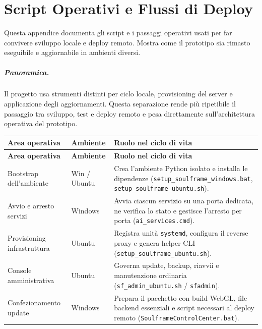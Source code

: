 \chapter{Script Operativi e Flussi di Deploy}
\label{app:ops}

\setlength{\emergencystretch}{3em}
\hfuzz=20pt

Questa appendice documenta gli script e i passaggi operativi usati per far convivere sviluppo locale e deploy remoto. Mostra come il prototipo sia rimasto eseguibile e aggiornabile in ambienti diversi.

\paragraph{Panoramica.}
Il progetto usa strumenti distinti per ciclo locale, provisioning del server e applicazione degli aggiornamenti. Questa separazione rende più ripetibile il passaggio tra sviluppo, test e deploy remoto e pesa direttamente sull'architettura operativa del prototipo.

\par\begingroup
\scriptsize
\setlength{\LTleft}{0pt}
\setlength{\LTright}{0pt}
\captionsetup{type=table}
\label{tab:appendix-ops-scripts}
\begin{longtable}{|>{\raggedright\arraybackslash}p{}|>{\raggedright\arraybackslash}p{}|>{\raggedright\arraybackslash}p{}|}
\hline
\textbf{Area operativa} & \textbf{Ambiente} & \textbf{Ruolo nel ciclo di vita} \\
\hline
\endfirsthead
\hline
\textbf{Area operativa} & \textbf{Ambiente} & \textbf{Ruolo nel ciclo di vita} \\
\hline
\endhead
Bootstrap dell'ambiente & Win / Ubuntu & Crea l'ambiente Python isolato e installa le dipendenze (\texttt{setup\_soulframe\_windows.bat}, \texttt{setup\_soulframe\_ubuntu.sh}). \\
\hline
Avvio e arresto servizi & Windows & Avvia ciascun servizio su una porta dedicata, ne verifica lo stato e gestisce l'arresto per porta (\texttt{ai\_services.cmd}). \\
\hline
Provisioning infrastruttura & Ubuntu & Registra unità \texttt{systemd}, configura il reverse proxy e genera helper CLI (\texttt{setup\_soulframe\_ubuntu.sh}). \\
\hline
Console amministrativa & Ubuntu & Governa update, backup, riavvii e manutenzione ordinaria (\texttt{sf\_admin\_ubuntu.sh} / \texttt{sfadmin}). \\
\hline
Confezionamento update & Windows & Prepara il pacchetto con build WebGL, file backend essenziali e script necessari al deploy remoto (\texttt{SoulframeControlCenter.bat}). \\
\hline
\end{longtable}
\par\endgroup

